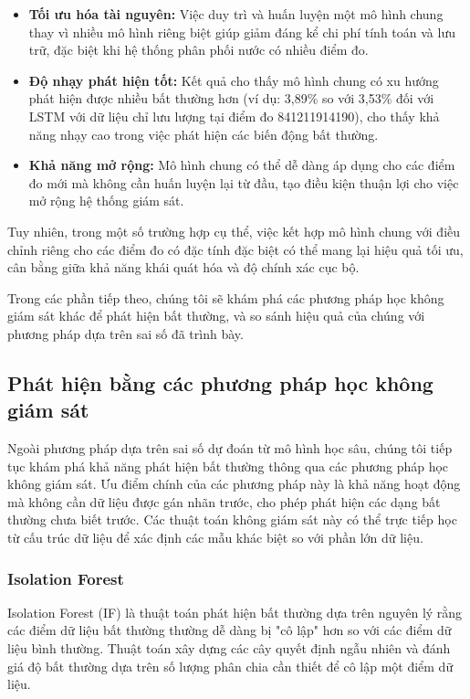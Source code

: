 \begin{itemize}
    \item \textbf{Tối ưu hóa tài nguyên:} Việc duy trì và huấn luyện một mô hình chung thay vì nhiều mô hình riêng biệt giúp giảm đáng kể chi phí tính toán và lưu trữ, đặc biệt khi hệ thống phân phối nước có nhiều điểm đo.
    
    \item \textbf{Độ nhạy phát hiện tốt:} Kết quả cho thấy mô hình chung có xu hướng phát hiện được nhiều bất thường hơn (ví dụ: 3,89\% so với 3,53\% đối với LSTM với dữ liệu chỉ lưu lượng tại điểm đo 841211914190), cho thấy khả năng nhạy cao trong việc phát hiện các biến động bất thường.
    
    \item \textbf{Khả năng mở rộng:} Mô hình chung có thể dễ dàng áp dụng cho các điểm đo mới mà không cần huấn luyện lại từ đầu, tạo điều kiện thuận lợi cho việc mở rộng hệ thống giám sát.
\end{itemize}

Tuy nhiên, trong một số trường hợp cụ thể, việc kết hợp mô hình chung với điều chỉnh riêng cho các điểm đo có đặc tính đặc biệt có thể mang lại hiệu quả tối ưu, cân bằng giữa khả năng khái quát hóa và độ chính xác cục bộ.

Trong các phần tiếp theo, chúng tôi sẽ khám phá các phương pháp học không giám sát khác để phát hiện bất thường, và so sánh hiệu quả của chúng với phương pháp dựa trên sai số đã trình bày.

\subsection{Phát hiện bằng các phương pháp học không giám sát}

Ngoài phương pháp dựa trên sai số dự đoán từ mô hình học sâu, chúng tôi tiếp tục khám phá khả năng phát hiện bất thường thông qua các phương pháp học không giám sát. Ưu điểm chính của các phương pháp này là khả năng hoạt động mà không cần dữ liệu được gán nhãn trước, cho phép phát hiện các dạng bất thường chưa biết trước. Các thuật toán không giám sát này có thể trực tiếp học từ cấu trúc dữ liệu để xác định các mẫu khác biệt so với phần lớn dữ liệu.

\subsubsection{Isolation Forest}

Isolation Forest (IF) là thuật toán phát hiện bất thường dựa trên nguyên lý rằng các điểm dữ liệu bất thường thường dễ dàng bị "cô lập" hơn so với các điểm dữ liệu bình thường. Thuật toán xây dựng các cây quyết định ngẫu nhiên và đánh giá độ bất thường dựa trên số lượng phân chia cần thiết để cô lập một điểm dữ liệu.

